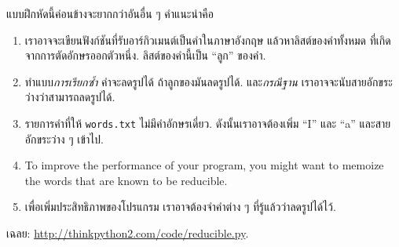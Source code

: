 \begin{exercise}
แบบฝึกหัดนี้ค่อนข้างจะยากกว่าอันอื่น ๆ
คำแนะนำคือ
\begin{enumerate}


\item เราอาจจะเขียนฟังก์ชันที่รับอาร์กิวเมนต์เป็นคำในภาษาอังกฤษ
แล้วหาลิสต์ของคำทั้งหมด ที่เกิดจากการตัดอักษรออกตัวหนึ่ง.
ลิสต์ของคำนี้เป็น ``ลูก'' ของคำ.


\item ทำแบบ\textit{การเรียกซ้ำ} คำจะลดรูปได้ ถ้าลูกของมันลดรูปได้.
และ\textit{กรณีฐาน} เราอาจจะนับสายอักขระว่างว่าสามารถลดรูปได้.


\item รายการคำที่ให้ \texttt{words.txt} ไม่มีคำอักษรเดี่ยว.
ดังนั้นเราอาจต้องเพิ่ม ``I'' และ ``a'' และสายอักขระว่าง ๆ เข้าไป.

\item To improve the performance of your program, you might want
to memoize the words that are known to be reducible.

\item เพื่อเพิ่มประสิทธิภาพของโปรแกรม เราอาจต้องจำคำต่าง ๆ ที่รู้แล้วว่าลดรูปได้ไว้.

\end{enumerate}

เฉลย: \url{http://thinkpython2.com/code/reducible.py}.


\end{exercise}
\vspace{0.5cm}








